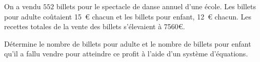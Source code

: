 %
%
    On a vendu $552$ billets pour le spectacle de danse annuel d'une école. Les billets pour adulte coûtaient 15~€ chacun et les billets pour enfant, 12~€ chacun. Les recettes totales de la vente des billets s'élevaient à \num{7560}{€}.

    Détermine le nombre de billets pour adulte et le nombre de billets pour enfant qu'il a fallu vendre pour atteindre ce profit à l'aide d'un système d'équations.
